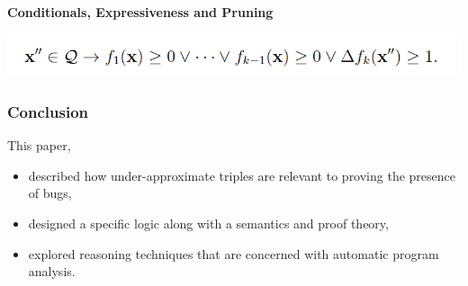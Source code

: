 \documentclass[11pt]{beamer}
\begin{document}
\begin{frame}
\textbf{Conditionals, Expressiveness and Pruning}
\begin{center}

\includegraphics[scale = 0.34]{13.png}
\end{center}
\end{frame}






\begin{frame}\frametitle{Conclusion}
This paper,
\begin{itemize}
\item described how  under-approximate triples are relevant to proving the presence of bugs,
\item designed a specific logic along with a semantics and proof theory,
\item explored reasoning techniques that are concerned with automatic program analysis.

\end{itemize}

\end{frame}
\end{document}
